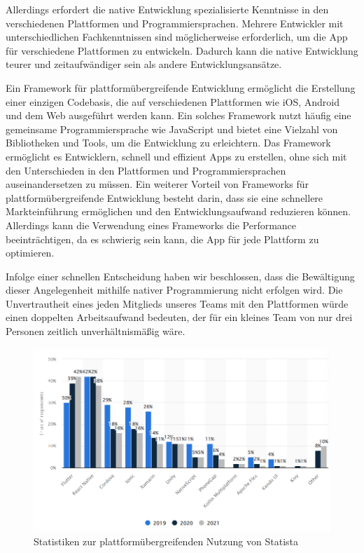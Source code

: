 Allerdings erfordert die native Entwicklung spezialisierte Kenntnisse in den verschiedenen Plattformen und Programmiersprachen. Mehrere Entwickler mit unterschiedlichen Fachkenntnissen sind möglicherweise erforderlich, um die App für verschiedene Plattformen zu entwickeln. Dadurch kann die native Entwicklung teurer und zeitaufwändiger sein als andere Entwicklungsansätze.

Ein Framework für plattformübergreifende Entwicklung ermöglicht die Erstellung einer einzigen Codebasis, die auf verschiedenen Plattformen wie iOS, Android und dem Web ausgeführt werden kann. Ein solches Framework nutzt häufig eine gemeinsame Programmiersprache wie JavaScript und bietet eine Vielzahl von Bibliotheken und Tools, um die Entwicklung zu erleichtern. Das Framework ermöglicht es Entwicklern, schnell und effizient Apps zu erstellen, ohne sich mit den Unterschieden in den Plattformen und Programmiersprachen auseinandersetzen zu müssen. Ein weiterer Vorteil von Frameworks für plattformübergreifende Entwicklung besteht darin, dass sie eine schnellere Markteinführung ermöglichen und den Entwicklungsaufwand reduzieren können. Allerdings kann die Verwendung eines Frameworks die Performance beeinträchtigen, da es schwierig sein kann, die App für jede Plattform zu optimieren.

Infolge einer schnellen Entscheidung haben wir beschlossen, dass die Bewältigung dieser Angelegenheit mithilfe nativer Programmierung nicht erfolgen wird. Die Unvertrautheit eines jeden Mitglieds unseres Teams mit den Plattformen würde einen doppelten Arbeitsaufwand bedeuten, der für ein kleines Team von nur drei Personen zeitlich unverhältnismäßig wäre.

\begin{figure}[htbp]
    \centering
    \includegraphics[width=1\textwidth]{pics/cross-platform-statisitics.png}
    \caption{Statistiken zur plattformübergreifenden Nutzung von Statista \cite{statista-software-developer-working-hours} }
    \label{fig:cross-platform-stats}
\end{figure}


